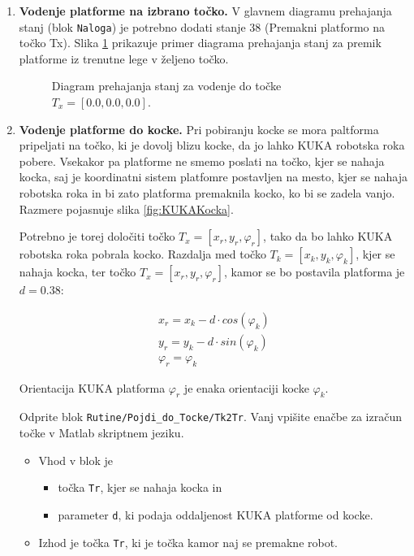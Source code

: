 \begin{enumerate}
\item \textbf{Vodenje platforme na izbrano točko.} V glavnem diagramu prehajanja stanj (blok \verb"Naloga") je potrebno dodati stanje 38 (Premakni platformo na točko Tx). Slika \ref{fig:DiagramNaTocko} prikazuje primer diagrama prehajanja stanj za premik platforme iz trenutne lege v željeno točko.

\begin{figure}[h]
\centering {}
\caption{Diagram prehajanja stanj za vodenje do točke $T_x=[0.0,0.0,0.0]$.}
\label{fig:DiagramNaTocko}
\end{figure}

\newpage



\item \textbf{Vodenje platforme do kocke.} Pri pobiranju kocke se mora paltforma pripeljati na točko, ki je dovolj blizu kocke, da jo lahko KUKA robotska roka pobere. Vsekakor pa platforme ne smemo poslati na točko, kjer se nahaja kocka, saj je koordinatni sistem platfomre postavljen na mesto, kjer se nahaja robotska roka in bi zato platforma premaknila kocko, ko bi se zadela vanjo. Razmere pojasnuje slika \ref{fig:KUKAKocka}.

\begin{mdframed}[backgroundcolor=yellow!20, shadow=true,roundcorner=8pt]

    Potrebno je torej določiti točko $T_x=[x_r,y_r,\varphi_r]$, tako da bo lahko KUKA robotska roka pobrala kocko. Razdalja med točko $T_k=[x_k,y_k,\varphi_k]$, kjer se nahaja kocka, ter točko $T_x=[x_r,y_r,\varphi_r]$, kamor se bo postavila platforma je $d=0.38$:

\begin{eqnarray}
    x_r = x_k-d\cdot cos(\varphi_k) \\
    y_r = y_k-d\cdot sin(\varphi_k) \\
    \varphi_r = \varphi_k
\end{eqnarray}

Orientacija KUKA platforma $\varphi_r$ je enaka orientaciji kocke $\varphi_k$.

Odprite blok \verb"Rutine/Pojdi_do_Tocke/Tk2Tr". Vanj vpišite enačbe za izračun točke v Matlab skriptnem jeziku.

\begin{itemize}
\item Vhod v blok je
\begin{itemize}
\item točka \verb"Tr", kjer se nahaja kocka in
\item parameter \verb"d", ki podaja oddaljenost KUKA platforme od kocke.
\end{itemize}
\item Izhod je točka \verb"Tr", ki je točka kamor naj se premakne robot.\\
\end{itemize}


\end{mdframed}
\end{enumerate}
